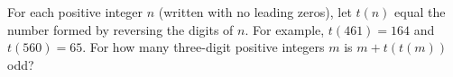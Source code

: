 For each positive integer $n$ (written with no leading zeros), let $t(n)$ equal the number formed by reversing the digits of $n$. For example, $t(461)=164$ and $t(560)=65$. For how many three-digit positive integers $m$ is $m+t(t(m))$ odd?